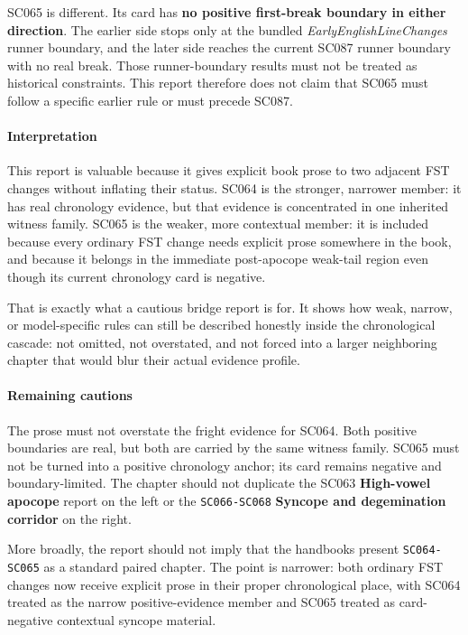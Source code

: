 \documentclass[
  british,
  a4paper,
]{article}
\begin{document}
SC065 is different. Its card has \textbf{no positive first-break
boundary in either direction}. The earlier side stops only at the
bundled \emph{EarlyEnglishLineChanges} runner boundary, and the later
side reaches the current SC087 runner boundary with no real break. Those
runner-boundary results must not be treated as historical constraints.
This report therefore does not claim that SC065 must follow a specific
earlier rule or must precede SC087.

\paragraph{Interpretation}\label{interpretation-41}

This report is valuable because it gives explicit book prose to two
adjacent FST changes without inflating their status. SC064 is the
stronger, narrower member: it has real chronology evidence, but that
evidence is concentrated in one inherited witness family. SC065 is the
weaker, more contextual member: it is included because every ordinary
FST change needs explicit prose somewhere in the book, and because it
belongs in the immediate post-apocope weak-tail region even though its
current chronology card is negative.

That is exactly what a cautious bridge report is for. It shows how weak,
narrow, or model-specific rules can still be described honestly inside
the chronological cascade: not omitted, not overstated, and not forced
into a larger neighboring chapter that would blur their actual evidence
profile.

\paragraph{Remaining cautions}\label{remaining-cautions-41}

The prose must not overstate the fright evidence for SC064. Both
positive boundaries are real, but both are carried by the same witness
family. SC065 must not be turned into a positive chronology anchor; its
card remains negative and boundary-limited. The chapter should not
duplicate the SC063 \textbf{High-vowel apocope} report on the left or
the \texttt{SC066-SC068} \textbf{Syncope and degemination corridor} on
the right.

More broadly, the report should not imply that the handbooks present
\texttt{SC064-SC065} as a standard paired chapter. The point is
narrower: both ordinary FST changes now receive explicit prose in their
proper chronological place, with SC064 treated as the narrow
positive-evidence member and SC065 treated as card-negative contextual
syncope material.
\end{document}
